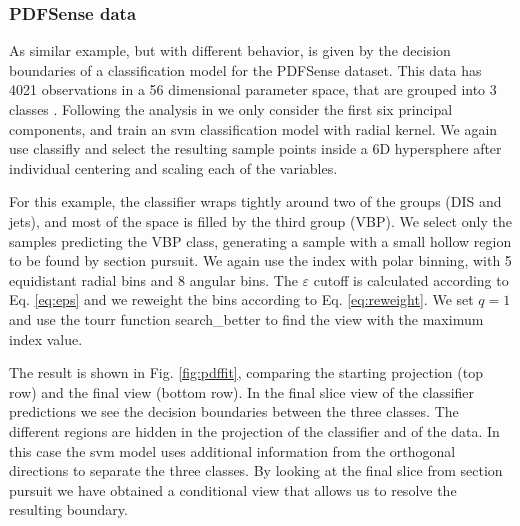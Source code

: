 \documentclass[]{interact}
\theoremstyle{plain}%
\theoremstyle{definition}
\theoremstyle{remark}
\begin{document}
\hypertarget{pdfsense-data}{%
\subsubsection{PDFSense data}\label{pdfsense-data}}

As similar example, but with different behavior, is given by the
decision boundaries of a classification model for the PDFSense dataset.
This data has 4021 observations in a 56 dimensional parameter space,
that are grouped into 3 classes \citep{Wang:2018heo}. Following the
analysis in \citet{Cook:2018mvr} we only consider the first six
principal components, and train an svm classification model with radial
kernel. We again use classifly and select the resulting sample points
inside a 6D hypersphere after individual centering and scaling each of
the variables.

For this example, the classifier wraps tightly around two of the groups
(DIS and jets), and most of the space is filled by the third group
(VBP). We select only the samples predicting the VBP class, generating a
sample with a small hollow region to be found by section pursuit. We
again use the index with polar binning, with 5 equidistant radial bins
and 8 angular bins. The \(\varepsilon\) cutoff is calculated according
to Eq. \ref{eq:eps} and we reweight the bins according to Eq.
\ref{eq:reweight}. We set \(q=1\) and use the tourr function
search\_better to find the view with the maximum index value.

The result is shown in Fig. \ref{fig:pdffit}, comparing the starting
projection (top row) and the final view (bottom row). In the final slice
view of the classifier predictions we see the decision boundaries
between the three classes. The different regions are hidden in the
projection of the classifier and of the data. In this case the svm model
uses additional information from the orthogonal directions to separate
the three classes. By looking at the final slice from section pursuit we
have obtained a conditional view that allows us to resolve the resulting
boundary.
\end{document}
